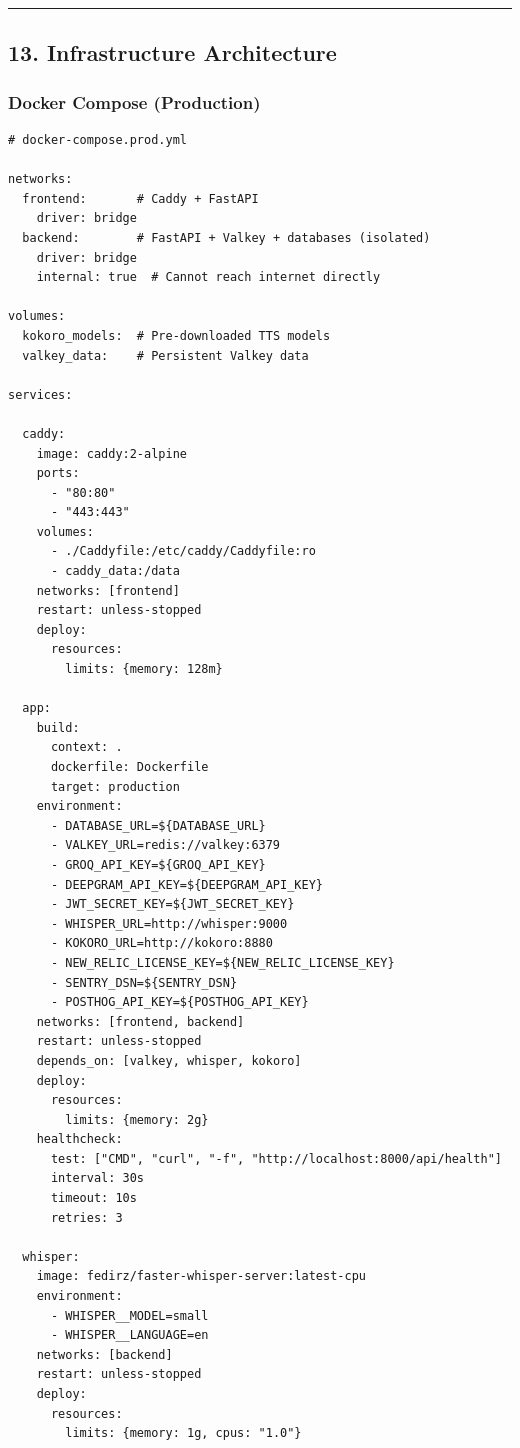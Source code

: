 \documentclass[
  11pt,
]{article}
\begin{document}
\begin{center}\rule{0.5\linewidth}{0.5pt}\end{center}

\hypertarget{infrastructure-architecture}{%
\subsection{13. Infrastructure
Architecture}\label{infrastructure-architecture}}

\hypertarget{docker-compose-production}{%
\subsubsection{Docker Compose
(Production)}\label{docker-compose-production}}

\begin{lstlisting}
# docker-compose.prod.yml

networks:
  frontend:       # Caddy + FastAPI
    driver: bridge
  backend:        # FastAPI + Valkey + databases (isolated)
    driver: bridge
    internal: true  # Cannot reach internet directly

volumes:
  kokoro_models:  # Pre-downloaded TTS models
  valkey_data:    # Persistent Valkey data

services:
  
  caddy:
    image: caddy:2-alpine
    ports:
      - "80:80"
      - "443:443"
    volumes:
      - ./Caddyfile:/etc/caddy/Caddyfile:ro
      - caddy_data:/data
    networks: [frontend]
    restart: unless-stopped
    deploy:
      resources:
        limits: {memory: 128m}
  
  app:
    build:
      context: .
      dockerfile: Dockerfile
      target: production
    environment:
      - DATABASE_URL=${DATABASE_URL}
      - VALKEY_URL=redis://valkey:6379
      - GROQ_API_KEY=${GROQ_API_KEY}
      - DEEPGRAM_API_KEY=${DEEPGRAM_API_KEY}
      - JWT_SECRET_KEY=${JWT_SECRET_KEY}
      - WHISPER_URL=http://whisper:9000
      - KOKORO_URL=http://kokoro:8880
      - NEW_RELIC_LICENSE_KEY=${NEW_RELIC_LICENSE_KEY}
      - SENTRY_DSN=${SENTRY_DSN}
      - POSTHOG_API_KEY=${POSTHOG_API_KEY}
    networks: [frontend, backend]
    restart: unless-stopped
    depends_on: [valkey, whisper, kokoro]
    deploy:
      resources:
        limits: {memory: 2g}
    healthcheck:
      test: ["CMD", "curl", "-f", "http://localhost:8000/api/health"]
      interval: 30s
      timeout: 10s
      retries: 3
  
  whisper:
    image: fedirz/faster-whisper-server:latest-cpu
    environment:
      - WHISPER__MODEL=small
      - WHISPER__LANGUAGE=en
    networks: [backend]
    restart: unless-stopped
    deploy:
      resources:
        limits: {memory: 1g, cpus: "1.0"}
  

\end{lstlisting}
\end{document}
